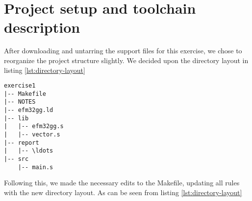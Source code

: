 \section{Project setup and toolchain description}

After downloading and untarring the support files for this exercise, we chose to reorganize the project structure slightly. We decided upon the directory layout in listing \ref{lst:directory-layout}

\begin{lstlisting}[label=lst:directory-layout,caption=Directory layout]
exercise1
|-- Makefile
|-- NOTES
|-- efm32gg.ld
|-- lib
|   |-- efm32gg.s
|   |-- vector.s
|-- report
|   |-- \ldots
|-- src
    |-- main.s
\end{lstlisting}

Following this, we made the necessary edits to the Makefile, updating all rules with the new directory layout. As can be seen from listing \ref{lst:directory-layout}

